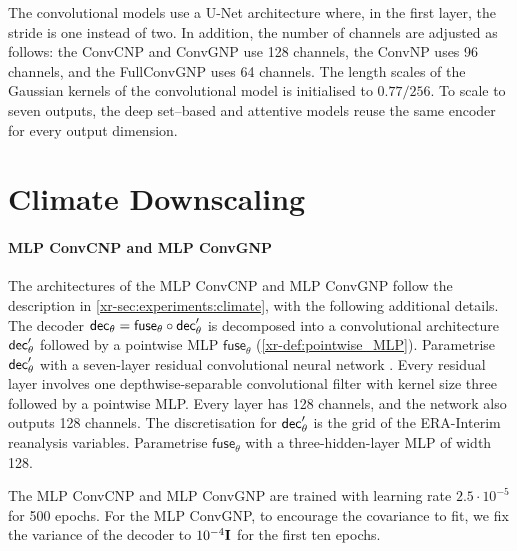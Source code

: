 \documentclass[12pt]{report}
\newcommand{\xrprefix}[1]{xr-#1}
\begin{document}
The convolutional models use a U-Net architecture where, in the first layer, the stride is one instead of two.
In addition, the number of channels are adjusted as follows:
the ConvCNP and ConvGNP use 128 channels, the ConvNP uses 96 channels, and the FullConvGNP uses 64 channels.
The length scales of the Gaussian kernels of the convolutional model is initialised to $0.77 / 256$.
To scale to seven outputs, the deep set--based and attentive models reuse the same encoder for every output dimension.

\section{Climate Downscaling}
\label{sec:experimental_details:climate}

\paragraph{MLP ConvCNP and MLP ConvGNP \parencite[\cref{\xrprefix{sec:experiments:climate}};][]{Vaughan:2022:Convolutional_Conditional_Neural_Processes_for}}
The architectures of the MLP ConvCNP and MLP ConvGNP follow the description in \cref{\xrprefix{sec:experiments:climate}}, with the following additional details.
The decoder $\mathsf{dec}_\theta = \mathsf{fuse}_\theta \circ \mathsf{dec}'_\theta$ is decomposed into a convolutional architecture $\mathsf{dec}'_\theta$ followed by a pointwise MLP $\mathsf{fuse}_\theta$ (\cref{\xrprefix{def:pointwise_MLP}}).
Parametrise $\mathsf{dec}'_\theta$ with a seven-layer residual convolutional neural network \parencite{He:2016:Deep_Residual_Learning_for_Image}.
Every residual layer involves one depthwise-separable convolutional filter \parencite{Chollet:2017:Xception_Deep_Learning_With_Depthwise} with kernel size three followed by a pointwise MLP.
Every layer has 128 channels, and the network also outputs 128 channels.
The discretisation for $\mathsf{dec}'_\theta$ is the grid of the ERA-Interim reanalysis variables.
Parametrise $\mathsf{fuse}_\theta$ with a three-hidden-layer MLP of width 128.

The MLP ConvCNP and MLP ConvGNP are trained with learning rate $2.5 \cdot 10^{-5}$ for 500 epochs.
For the MLP ConvGNP, to encourage the covariance to fit, we fix the variance of the decoder to $10^{-4} \mathbf{I}$ for the first ten epochs.
\end{document}
